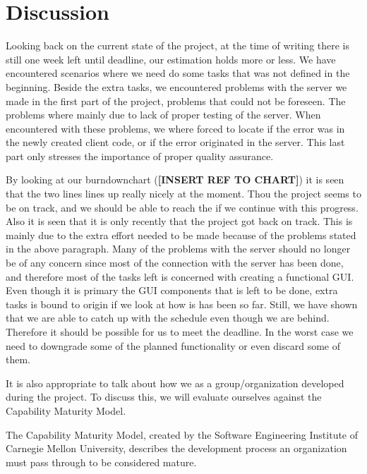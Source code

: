 \section{Discussion}
Looking back on the current state of the project, at the time of writing there is still one week left until deadline, our estimation holds more or less. We have encountered scenarios where we need do some tasks that was not defined in the beginning. Beside the extra tasks, we encountered problems with the server we made in the first part of the project, problems that could not be foreseen. The problems where mainly due to lack of proper testing of the server. When encountered with these problems, we where forced to locate if the error was in the newly created client code, or if the error originated in the server. This last part only stresses the importance of proper quality assurance.

By looking at our burndownchart (\textbf{[INSERT REF TO CHART]}) it is seen that the two lines lines up really nicely at the moment. Thou the project seems to be on track, and we should be able to reach the if we continue with this progress. Also it is seen that it is only recently that the project got back on track. This is mainly due to the extra effort needed to be made because of the problems stated in the above paragraph. Many of the problems with the server should no longer be of any concern since most of the connection with the server has been done, and therefore most of the tasks left is concerned with creating a functional GUI. \\
Even though it is primary the GUI components that is left to be done, extra tasks is bound to origin if we look at how is has been so far. Still, we have shown that we are able to catch up with the schedule even though we are behind. Therefore it should be possible for us to meet the deadline. In the worst case we need to downgrade some of the planned functionality or even discard some of them.

It is also appropriate to talk about how we as a group/organization developed during the project. To discuss this, we will evaluate ourselves against the Capability Maturity Model.

The Capability Maturity Model, created by the Software Engineering Institute of Carnegie Mellon University, describes the development process an organization must pass through to be considered mature.

